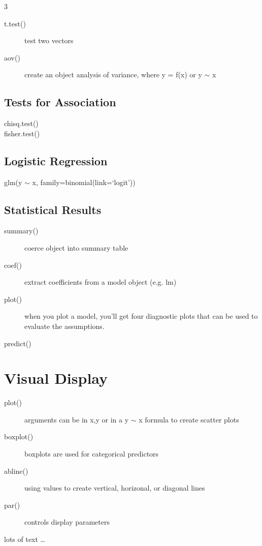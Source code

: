 \documentclass{article}\usepackage[]{graphicx}\usepackage[]{xcolor}
\begin{document}
\begin{multicols}{3}
\begin{description}
\item[t.test()] test two vectors 
\item[aov()] create an object analysis of variance, where y = f(x) or y $\sim$ x
\end{description}

\subsection*{Tests for Association}

\begin{description}
\item[chisq.test()] 
\item[fisher.test()]
\end{description}

\subsection*{Logistic Regression}

\begin{description}
\item[glm(y $\sim$ x, family=binomial(link=`logit'))] 
\end{description}

\subsection*{Statistical Results}
\begin{description}
\item[summary()] coerce object into summary table
\item[coef()] extract coefficients from a model object (e.g. lm)
\item[plot()] when you plot a model, you'll get four diagnostic plots that can be used to evaluate the assumptions.
\item[predict()]
\end{description}

\section*{Visual Display}

\begin{description}
\item[plot()] arguments can be in x,y or in a y $\sim$ x formula to create scatter plots
\item[boxplot()] boxplots are used for categorical predictors
\item[abline()] using values to create vertical, horizonal, or diagonal lines
\item[par()] controls display parameters

\end{description}

  lots of text
  \ldots
\end{multicols}
\end{document}
